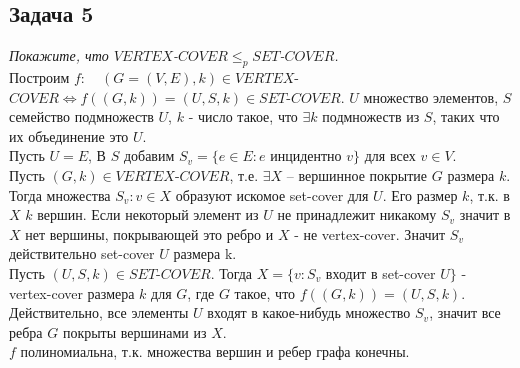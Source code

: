 \documentclass{article}
\begin{document}
\subsection*{Задача 5}
\textit{Покажите, что $VERTEX$-$COVER \leqslant_p SET$-$COVER$.}\\
Построим $f: \quad (G=(V, E), k) \in VERTEX$-$COVER \Leftrightarrow f((G, k)) = (U, S, k) \in SET$-$COVER$. $U$ множество элементов, $S$ семейство подмножеств $U$, $k$ - число такое, что $\exists k$ подмножеств из $S$, таких что их объединение это $U$.\\
Пусть $U = E$, В $S$ добавим $S_v = \{e \in E: e$ инцидентно $v\}$ для всех $v \in V$.\\
Пусть $(G, k) \in VERTEX$-$COVER$, т.е. $\exists X$ -- вершинное покрытие $G$ размера $k$. Тогда множества $S_v: v \in X$ образуют искомое set-cover для $U$. Его размер $k$, т.к. в $X$ $k$ вершин. Если некоторый элемент из $U$ не принадлежит никакому $S_v$ значит в $X$ нет вершины, покрывающей это ребро и $X$ - не vertex-cover. Значит $S_v$ действительно set-cover $U$ размера k.\\
Пусть $(U, S, k) \in SET$-$COVER$. Тогда $X = \{v:S_v$ входит в set-cover $U \}$ - vertex-cover размера $k$ для $G$, где $G$ такое, что $f((G, k)) = (U, S, k)$. Действительно, все элементы $U$ входят в какое-нибудь множество $S_v$, значит все ребра $G$ покрыты вершинами из $X$.\\
$f$ полиномиальна, т.к. множества вершин и ребер графа конечны.
\end{document}
